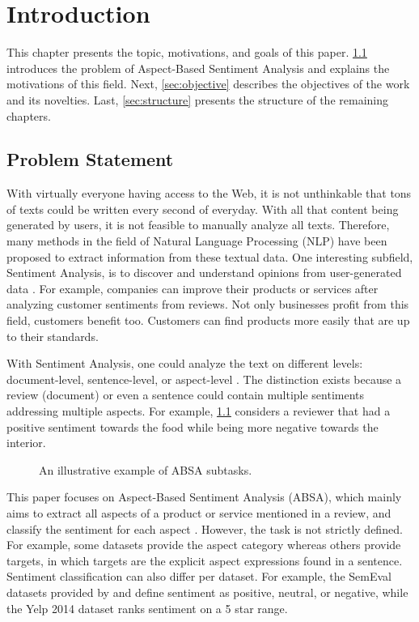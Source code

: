 \documentclass[american, oneside]{ecsgdp}
\begin{document}
\tableofcontents

\mainmatter
\chapter{Introduction} \label{chap:introduction}
This chapter presents the topic, motivations, and goals of this paper. \cref{sec:problem} introduces the problem of Aspect-Based Sentiment Analysis and explains the motivations of this field. Next, \cref{sec:objective} describes the objectives of the work and its novelties. Last, \cref{sec:structure} presents the structure of the remaining chapters. %

\section{Problem Statement} \label{sec:problem}
With virtually everyone having access to the Web, it is not unthinkable that tons of texts could be written every second of everyday. With all that content being generated by users, it is not feasible to manually analyze all texts. Therefore, many methods in the field of Natural Language Processing (NLP) have been proposed to extract information from these textual data. One interesting subfield, Sentiment Analysis, is to discover and understand opinions from user-generated data \parencite{Liu2012SAOP}. For example, companies can improve their products or services after analyzing customer sentiments from reviews. Not only businesses profit from this field, customers benefit too. Customers can find products more easily that are up to their standards.

With Sentiment Analysis, one could analyze the text on different levels: document-level, sentence-level, or aspect-level \parencite{Liu2012SAOP}. The distinction exists because a review (document) or even a sentence could contain multiple sentiments addressing multiple aspects. For example, \cref{fig:example_review} considers a reviewer that had a positive sentiment towards the food while being more negative towards the interior.

\begin{figure}[htbp]
  \centering
  
  \caption{An illustrative example of ABSA subtasks.}
  \label{fig:example_review}
\end{figure}

This paper focuses on Aspect-Based Sentiment Analysis (ABSA), which mainly aims to extract all aspects of a product or service mentioned in a review, and classify the sentiment for each aspect \parencite{Liu2012SAOP}. However, the task is not strictly defined. For example, some datasets provide the aspect category whereas others provide targets, in which targets are the explicit aspect expressions found in a sentence. Sentiment classification can also differ per dataset. For example, the SemEval datasets provided by \textcite{Pontiki2015SemEval} and \textcite{Pontiki2016SemEval} define sentiment as positive, neutral, or negative, while the Yelp 2014 dataset \parencite{Tang2016Yelp} ranks sentiment on a 5 star range.
\end{document}
